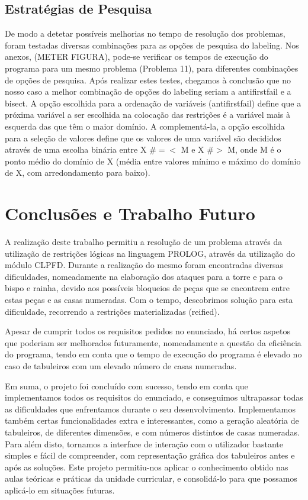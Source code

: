 \documentclass[runningheads]{llncs}
\begin{document}
\subsection{Estratégias de Pesquisa}

De modo a detetar possíveis melhorias no tempo de resolução dos problemas, foram testadas diversas combinações para as opções de pesquisa do labeling. 
Nos anexos, (METER FIGURA), pode-se verificar os tempos de execução do programa para um mesmo problema (Problema 11), para diferentes combinações de opções de pesquisa.
Após realizar estes testes, chegamos à conclusão que no nosso caso a melhor combinação de opções do labeling seriam a anti\textunderscore first\textunderscore fail e a bisect.
A opção escolhida para a ordenação de variáveis (anti\textunderscore first\textunderscore fail) define que a próxima variável a ser escolhida na colocação das restrições é a variável mais à esquerda das que têm o maior domínio.
A complementá-la, a opção escolhida para a seleção de valores define que os valores de uma 
variável são decididos através de uma escolha binária entre X  \#$=<$ M e X  \#$>$ M, onde M 
é o ponto médio do domínio de X (média entre valores mínimo e máximo do domínio de X, 
com arredondamento para baixo).

\section{Conclusões e Trabalho Futuro}

A realização deste trabalho permitiu a resolução de um problema através da utilização de restrições lógicas na linguagem PROLOG, através da utilização do módulo CLPFD.
Durante a realização do mesmo foram encontradas diversas dificuldades, nomeadamente na elaboração dos ataques para a torre e para o bispo e rainha, devido aos possíveis bloqueios de peças que se encontrem entre estas peças e as casas numeradas.
Com o tempo, descobrimos solução para esta dificuldade, recorrendo a restrições materializadas (reified).

Apesar de cumprir todos os requisitos pedidos no enunciado, há certos aspetos que poderiam ser melhorados futuramente, nomeadamente a questão da eficiência do programa, tendo em conta que o tempo de execução do programa
é elevado no caso de tabuleiros com um elevado número de casas numeradas.

Em suma, o projeto foi concluído com sucesso, tendo em conta que implementamos todos os requisitos do enunciado, e conseguimos ultrapassar todas as dificuldades que enfrentamos durante o seu desenvolvimento.
Implementamos também certas funcionalidades extra e interessantes, como a geração aleatória de tabuleiros, de diferentes dimensões, e com números distintos de casas numeradas. Para além disto, tornamos a interface de interação com o utilizador bastante simples e fácil de compreender,
com representação gráfica dos tabuleiros antes e após as soluções. Este projeto permitiu-nos aplicar o conhecimento obtido nas aulas teóricas e práticas da unidade curricular, e consolidá-lo para que possamos aplicá-lo em situações futuras.
\end{document}

